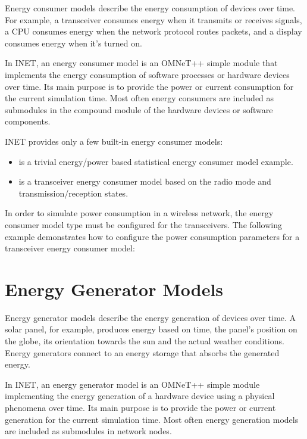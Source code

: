 Energy consumer models describe the energy consumption of devices over time. 
For example, a transceiver consumes energy when it transmits or
receives signals, a CPU consumes energy when the network protocol routes
packets, and a display consumes energy when it's turned on.

In INET, an energy consumer model is an OMNeT++ simple module that implements
the energy consumption of software processes or hardware devices over time.
Its main purpose is to provide the power or current consumption for the
current simulation time. Most often energy consumers are included as
submodules in the compound module of the hardware devices or software
components.

INET provides only a few built-in energy consumer models:

\begin{itemize}
        \item {} is a trivial energy/power based statistical energy consumer model example.
        \item {} is a transceiver energy consumer model based on the radio mode and transmission/reception states.
\end{itemize}

In order to simulate power consumption in a wireless network, the energy
consumer model type must be configured for the transceivers. The following
example demonstrates how to configure the power consumption parameters for
a transceiver energy consumer model:



\section{Energy Generator Models}

Energy generator models describe the energy generation of devices over time. 
A solar panel, for example, produces energy based on time, the panel's 
position on the globe, its orientation towards the sun and the actual weather 
conditions. Energy generators connect to an energy storage that absorbs the 
generated energy. 

In INET, an energy generator model is an OMNeT++ simple module implementing
the energy generation of a hardware device using a physical phenomena over
time. Its main purpose is to provide the power or current generation for
the current simulation time. Most often energy generation models are
included as submodules in network nodes.

